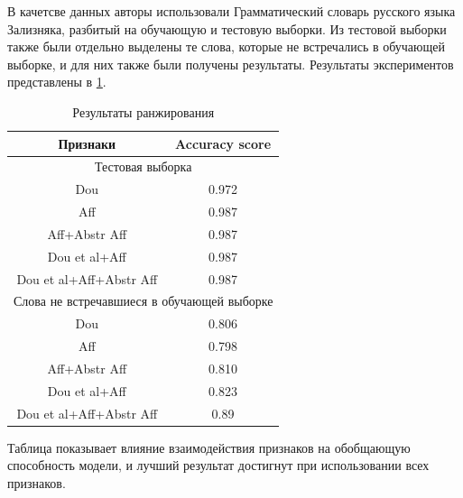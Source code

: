 \documentclass[14pt, a4paper, russian]{extreport}
\begin{document}
В качетсве данных авторы использовали Грамматический словарь русского языка Зализняка\cite{zaliz}, разбитый на обучающую и тестовую выборки. Из тестовой выборки также были отдельно выделены те слова, которые не встречались в обучающей выборке,  и для них также были получены  результаты. Результаты экспериментов представлены в \cref{table:range_res}.
\begin{table}[H]
		\caption{Результаты ранжирования}

	\begin{small}
		\begin{center}
			\begin{tabular}{|c|c|}
				\hline
				       Признаки         &             Accuracy score             \\ \hline
				\multicolumn{2}{|c|}{Тестовая выборка}                           \\ \hline
				          Dou           &                 0.972                  \\ \hline
				          Aff           &                 0.987                  \\ \hline
				     Aff+Abstr Aff      &                 0.987                  \\ \hline
				     Dou et al+Aff      &                 0.987                  \\ \hline
				Dou et al+Aff+Abstr Aff &                 0.987                  \\ \hline
				\multicolumn{2}{|c|}{Слова не встречавшиеся в обучающей выборке} \\ \hline
				          Dou           &                 0.806                  \\ \hline
				          Aff           &                 0.798                  \\ \hline
				     Aff+Abstr Aff      &                 0.810                  \\ \hline
				     Dou et al+Aff      &                 0.823                  \\ \hline
				Dou et al+Aff+Abstr Aff &                  0.89                  \\ \hline
			\end{tabular}
		\end{center}
	\end{small}
	\label{table:range_res}
\end{table}

Таблица показывает  влияние взаимодействия признаков на обобщающую способность модели, и лучший результат достигнут при использовании всех признаков.
\end{document}
